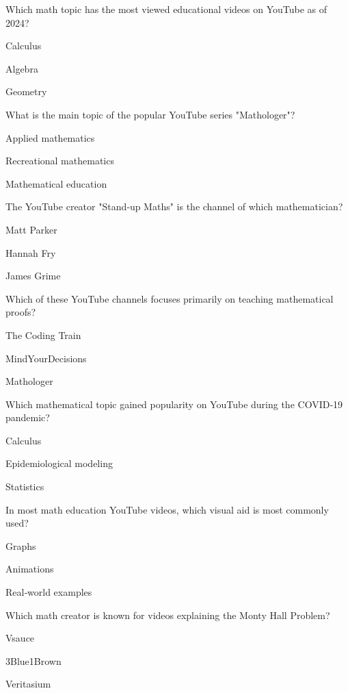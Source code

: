 \begin{enhancedmcq}{Which math topic has the most viewed educational videos on YouTube as of 2024?}
\item Calculus
\item Algebra
\item Geometry

\end{enhancedmcq}
\begin{enhancedmcq}{What is the main topic of the popular YouTube series "Mathologer"?}
\item Applied mathematics
\item Recreational mathematics
\item Mathematical education

\end{enhancedmcq}
\begin{enhancedmcq}{The YouTube creator "Stand‑up Maths" is the channel of which mathematician?}
\item Matt Parker
\item Hannah Fry
\item James Grime

\end{enhancedmcq}
\begin{enhancedmcq}{Which of these YouTube channels focuses primarily on teaching mathematical proofs?}
\item The Coding Train
\item MindYourDecisions
\item Mathologer

\end{enhancedmcq}
\begin{enhancedmcq}{Which mathematical topic gained popularity on YouTube during the COVID‑19 pandemic?}
\item Calculus
\item Epidemiological modeling
\item Statistics

\end{enhancedmcq}
\begin{enhancedmcq}{In most math education YouTube videos, which visual aid is most commonly used?}
\item Graphs
\item Animations
\item Real‑world examples

\end{enhancedmcq}
\begin{enhancedmcq}{Which math creator is known for videos explaining the Monty Hall Problem?}
\item Vsauce
\item 3Blue1Brown
\item Veritasium

\end{enhancedmcq}
